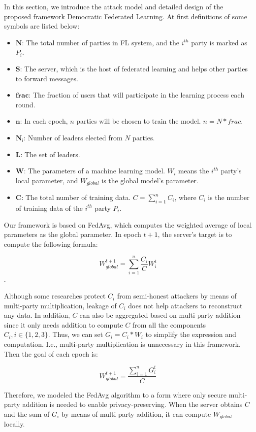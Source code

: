 In this section, we introduce the attack model and detailed design of the proposed framework Democratic Federated Learning. At first definitions of some symbols are listed below:
\begin{itemize}
    \item $\textbf{N}$: The total number of parties in FL system, and the  $i^{th}$ party is marked as $P_i$.
    \item $\textbf{S}$: The server, which is the host of federated learning and helps other parties to forward messages.
    \item $\textbf{frac}$: The fraction of users that will participate in the learning process each round.
    \item $\textbf{n}$: In each epoch, $n$ parties will be chosen to train the model. $n = N * frac$.
    \item $\textbf{N}_l$: Number of leaders elected from $N$ parties.
    \item $\textbf{L}$: The set of leaders.
    \item $\textbf{W}$: The parameters of a machine learning model. $W_i$ means the $i^{th}$ party's local parameter, and $W_{global}$ is the global model's parameter.
    \item $\textbf{C}$: The total number of training data. $C = \sum_{i=1}^nC_i$, where $C_i$ is the number of training data of the $i^{th}$ party $P_i$.
\end{itemize}

Our framework is based on FedAvg, which computes the weighted average of local parameters as the global parameter. In epoch $t+1$, the server's target is to compute the following formula:

$$W_{global}^{t+1} = \sum_{i=1}^n\frac{C_i}{C}W_i^t$$. 

Although some researches protect $C_i$ from semi-honest attackers by means of multi-party multiplication, leakage of $C_i$ does not help attackers to reconstruct any data. In addition, $C$ can also be aggregated based on multi-party addition since it only needs addition to compute $C$ from all the components $C_i, i \in \{1,2,3\}$. Thus, we can set $G_i = C_i * W_i$ to simplify the expression and computation. I.e., multi-party multiplication is unnecessary in this framework. Then the goal of each epoch is:

$$ W_{global}^{t+1} = \frac{\sum_{i=1}^nG_i^t}{C} $$

Therefore, we modeled the FedAvg algorithm to a form where only secure multi-party addition is needed to enable privacy-preserving. When the server obtains $C$ and the sum of $G_i$ by means of multi-party addition, it can compute $W_{global}$ locally.

